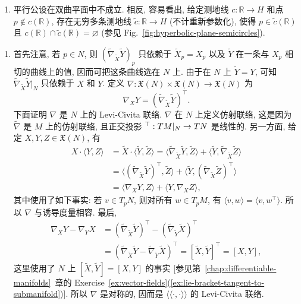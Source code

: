 \begin{description}[font=\normalfont,leftmargin=2em,labelwidth=1.5em]
\begin{enumerate}[label=(\alph*),ref=\alph*,leftmargin=*]
\item 平行公设在双曲平面中不成立. 相反, 容易看出, 给定测地线 $c:\mathbb{R}\to H$ 和点 $p\notin c(\mathbb{R})$, 存在无穷多条测地线 $\widetilde c:\mathbb{R}\to H$ (不计重新参数化), 使得 $p\in\widetilde c(\mathbb{R})$ 且 $c(\mathbb{R})\cap\widetilde c(\mathbb{R})=\varnothing$ (参见 Fig.~\ref{fig:hyperbolic-plane-semicircles}).
\end{enumerate}

\begin{enumerate}[label=(\alph*),ref=\alph*,leftmargin=*]
\item 首先注意, 若 $p\in N$, 则 $(\widetilde\nabla_{\widetilde X}\widetilde Y)_p$ 只依赖于 $\widetilde X_p=X_p$ 以及 $\widetilde Y$ 在一条与 $X_p$ 相切的曲线上的值, 因而可把这条曲线选在 $N$ 上. 由于在 $N$ 上 $\widetilde Y=Y$, 可知 $\widetilde\nabla_{\widetilde X}\widetilde Y|_N$ 只依赖于 $X$ 和 $Y$. 定义 $\nabla:\mathfrak{X}(N)\times\mathfrak{X}(N)\to\mathfrak{X}(N)$ 为
\[
  \nabla_XY=(\widetilde\nabla_{\widetilde X}\widetilde Y)^\top.
\]
下面证明 $\nabla$ 是 $N$ 上的 Levi-Civita 联络. $\nabla$ 在 $N$ 上定义仿射联络, 这是因为 $\widetilde\nabla$ 是 $M$ 上的仿射联络, 且正交投影 $\vphantom{w}^\top:TM|_N\to TN$ 是线性的. 另一方面, 给定 $X,Y,Z\in\mathfrak{X}(N)$, 有
\begin{align*}
  X\cdot\langle Y,Z\rangle
  &=\widetilde X\cdot\langle\widetilde Y,\widetilde Z\rangle
    =\langle\widetilde\nabla_{\widetilde X}\widetilde Y,\widetilde Z\rangle
     +\langle\widetilde Y,\widetilde\nabla_{\widetilde X}\widetilde Z\rangle\\
  &=\langle(\widetilde\nabla_{\widetilde X}\widetilde Y)^\top,\widetilde Z\rangle
     +\langle\widetilde Y,(\widetilde\nabla_{\widetilde X}\widetilde Z)^\top\rangle\\
  &=\langle\nabla_XY,Z\rangle+\langle Y,\nabla_XZ\rangle,
\end{align*}
其中使用了如下事实: 若 $v\in T_pN$, 则对所有 $w\in T_pM$, 有 $\langle v,w\rangle=\langle v,w^\top\rangle$. 所以 $\nabla$ 与诱导度量相容. 最后,
\begin{align*}
  \nabla_XY-\nabla_YX
  &=(\widetilde\nabla_{\widetilde X}\widetilde Y)^\top-
      (\widetilde\nabla_{\widetilde Y}\widetilde X)^\top\\
  &=(\widetilde\nabla_{\widetilde X}\widetilde Y-\widetilde\nabla_{\widetilde Y}\widetilde X)^\top
    =[\widetilde X,\widetilde Y]^\top=[X,Y],
\end{align*}
这里使用了 $N$ 上 $[\widetilde X,\widetilde Y]=[X,Y]$ 的事实 [参见第~\ref{chap:differentiable-manifolds}~章的 Exercise~\ref{ex:vector-fields}(\ref{ex:lie-bracket-tangent-to-submanifold})]. 所以 $\nabla$ 是对称的, 因而是 $\langle\langle\cdot,\cdot\rangle\rangle$ 的 Levi-Civita 联络.

\end{enumerate}
\end{description}
